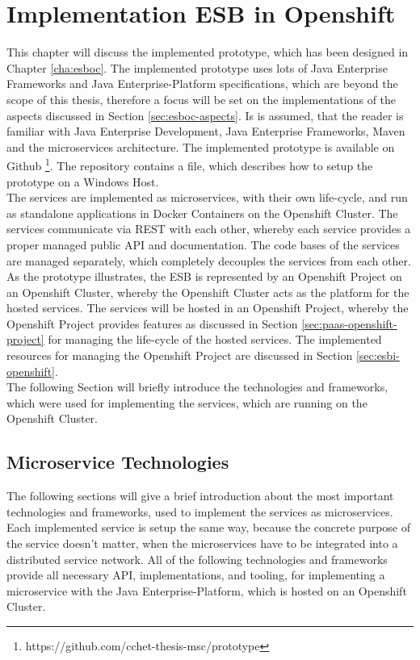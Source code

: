 \chapter{Implementation ESB in Openshift}
\label{cha:esbi}
This chapter will discuss the implemented prototype, which has been designed in Chapter \vref{cha:esboc}. The implemented prototype uses lots of Java Enterprise Frameworks and Java Enterprise-Platform specifications, which are beyond the scope of this thesis, therefore a focus will be set on the implementations of the aspects discussed in Section \vref{sec:esboc-aspects}. Is is assumed, that the reader is familiar with Java Enterprise Development, Java Enterprise Frameworks, Maven and the microservices architecture. The implemented prototype is available on Github \footnote{https://github.com/cchet-thesis-msc/prototype}. The repository contains a  file, which describes how to setup the prototype on a Windows Host. \\

The services are implemented as microservices, with their own life-cycle, and run as standalone applications in Docker Containers on the Openshift Cluster. The services communicate via REST with each other, whereby each service provides a proper managed public API and documentation. The code bases of the services are managed separately, which completely decouples the services from each other. \\

As the prototype illustrates, the ESB is represented by an Openshift Project on an Openshift Cluster, whereby the Openshift Cluster acts as the platform for the hosted services. The services will be hosted in an Openshift Project, whereby the Openshift Project provides features as discussed in Section \vref{sec:paas-openshift-project} for managing the life-cycle of the hosted services. The implemented resources for managing the Openshift Project are discussed in Section \vref{sec:esbi-openshift}. \\

The following Section will briefly introduce the technologies and frameworks, which were used for implementing the services, which are running on the Openshift Cluster.

\section{Microservice Technologies}
\label{sec:esbi-technolody-fis}
The following sections will give a brief introduction about the most important technologies and frameworks, used to implement the services as microservices. Each implemented service is setup the same way, because the concrete purpose of the service doesn't matter, when the microservices have to be integrated into a distributed service network. All of the following technologies and frameworks provide all necessary API, implementations, and tooling, for implementing a microservice with the Java Enterprise-Platform, which is hosted on an Openshift Cluster.

